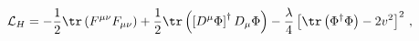 \begin{equation}
\mathcal{L}_H =  -\frac{1}{2} \tr \left(F^{\mu\nu}F_{\mu\nu}\right) 
+ \frac{1}{2}\tr 
\left(\left[D^{\mu}\Phi \right]^{\dag} D_{\mu}\Phi\right) - 
\frac{\lambda}{4}\left[ 
\tr\left(\Phi^{\dag}\Phi\right) - 2v^2 \right]^2 \, ,
\label{HiggsLagrangian}
\end{equation}

